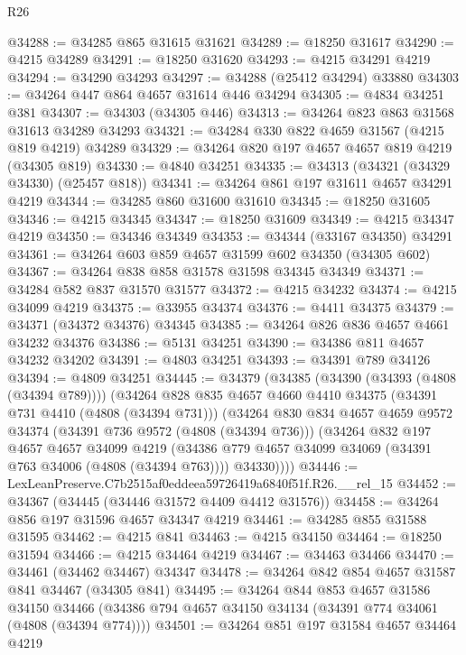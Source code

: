 \begin{lexlean}{R26}
\begin{coremodule}
@34288 := @34285 @865 @31615 @31621
@34289 := @18250 @31617
@34290 := @4215 @34289
@34291 := @18250 @31620
@34293 := @4215 @34291 @4219
@34294 := @34290 @34293
@34297 := @34288 (@25412 @34294) @33880
@34303 := @34264 @447 @864 @4657 @31614 @446 @34294
@34305 := @4834 @34251 @381
@34307 := @34303 (@34305 @446)
@34313 := @34264 @823 @863 @31568 @31613 @34289 @34293
@34321 := @34284 @330 @822 @4659 @31567 (@4215 @819 @4219) @34289
@34329 := @34264 @820 @197 @4657 @4657 @819 @4219 (@34305 @819)
@34330 := @4840 @34251
@34335 := @34313 (@34321 (@34329 @34330) (@25457 @818))
@34341 := @34264 @861 @197 @31611 @4657 @34291 @4219
@34344 := @34285 @860 @31600 @31610
@34345 := @18250 @31605
@34346 := @4215 @34345
@34347 := @18250 @31609
@34349 := @4215 @34347 @4219
@34350 := @34346 @34349
@34353 := @34344 (@33167 @34350) @34291
@34361 := @34264 @603 @859 @4657 @31599 @602 @34350 (@34305 @602)
@34367 := @34264 @838 @858 @31578 @31598 @34345 @34349
@34371 := @34284 @582 @837 @31570 @31577
@34372 := @4215 @34232
@34374 := @4215 @34099 @4219
@34375 := @33955 @34374
@34376 := @4411 @34375
@34379 := @34371 (@34372 @34376) @34345
@34385 := @34264 @826 @836 @4657 @4661 @34232 @34376
@34386 := @5131 @34251
@34390 := @34386 @811 @4657 @34232 @34202
@34391 := @4803 @34251
@34393 := @34391 @789 @34126
@34394 := @4809 @34251
@34445 := @34379
    (@34385
      (@34390 (@34393 (@4808 (@34394 @789))))
      (@34264
        @828
        @835
        @4657
        @4660
        @4410
        @34375
        (@34391 @731 @4410 (@4808 (@34394 @731)))
        (@34264
          @830
          @834
          @4657
          @4659
          @9572
          @34374
          (@34391 @736 @9572 (@4808 (@34394 @736)))
          (@34264
            @832
            @197
            @4657
            @4657
            @34099
            @4219
            (@34386 @779 @4657 @34099 @34069 (@34391 @763 @34006 (@4808 (@34394 @763))))
            @34330))))
@34446 := LexLeanPreserve.C7b2515af0eddeea59726419a6840f51f.R26.__rel_15
@34452 := @34367 (@34445 (@34446 @31572 @4409 @4412 @31576))
@34458 := @34264 @856 @197 @31596 @4657 @34347 @4219
@34461 := @34285 @855 @31588 @31595
@34462 := @4215 @841
@34463 := @4215 @34150
@34464 := @18250 @31594
@34466 := @4215 @34464 @4219
@34467 := @34463 @34466
@34470 := @34461 (@34462 @34467) @34347
@34478 := @34264 @842 @854 @4657 @31587 @841 @34467 (@34305 @841)
@34495 := @34264
    @844
    @853
    @4657
    @31586
    @34150
    @34466
    (@34386 @794 @4657 @34150 @34134 (@34391 @774 @34061 (@4808 (@34394 @774))))
@34501 := @34264 @851 @197 @31584 @4657 @34464 @4219

\end{coremodule}
\end{lexlean}
